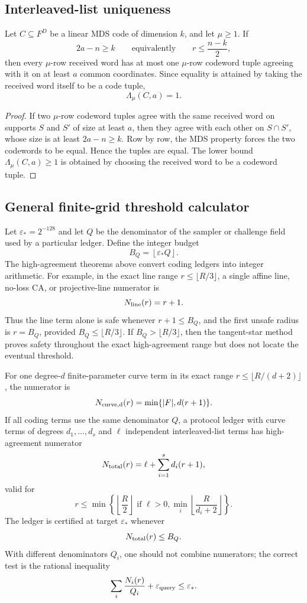 \subsection{Interleaved-list uniqueness}

\begin{theorem}
\label{thm:uniform-interleaved-uniqueness}
Let \(C\subseteq F^D\) be a linear MDS code of dimension \(k\), and let
\(\mu\ge1\).
If
\[
  2a-n\ge k
  \qquad\text{equivalently}\qquad
  r\le\frac{n-k}{2},
\]
then every \(\mu\)-row received word has at most one \(\mu\)-row codeword tuple
agreeing with it on at least \(a\) common coordinates.  Since equality is
attained by taking the received word itself to be a code tuple,
\[
  \Lambda_\mu(C,a)=1 .
\]
\end{theorem}

\begin{proof}
If two \(\mu\)-row codeword tuples agree with the same received word on supports
\(S\) and \(S'\) of size at least \(a\), then they agree with each other on
\(S\cap S'\), whose size is at least \(2a-n\ge k\).  Row by row, the MDS
property forces the two codewords to be equal.  Hence the tuples are equal.
The lower bound \(\Lambda_\mu(C,a)\ge1\) is obtained by choosing the received
word to be a codeword tuple.
\end{proof}

\subsection{General finite-grid threshold calculator}

Let \(\varepsilon_*=2^{-128}\) and let \(Q\) be the denominator of the sampler or
challenge field used by a particular ledger.  Define the integer budget
\[
  B_Q=\left\lfloor \varepsilon_* Q\right\rfloor .
\]
The high-agreement theorems above convert coding ledgers into integer arithmetic.
For example, in the exact line range \(r\le\lfloor R/3\rfloor\), a single affine
line, no-loss CA, or projective-line numerator is
\[
  N_{\rm line}(r)=r+1 .
\]
Thus the line term alone is safe whenever \(r+1\le B_Q\), and the first unsafe
radius is \(r=B_Q\), provided \(B_Q\le\lfloor R/3\rfloor\).  If
\(B_Q>\lfloor R/3\rfloor\), then the tangent-star method proves safety
throughout the exact high-agreement range but does not locate the eventual
threshold.

For one degree-\(d\) finite-parameter curve term in its exact range
\(r\le\lfloor R/(d+2)\rfloor\), the numerator is
\[
  N_{\rm curve,d}(r)=\min\{|F|,d(r+1)\}.
\]
If all coding terms use the same denominator \(Q\), a protocol ledger with curve
terms of degrees \(d_1,\ldots,d_s\) and \(\ell\) independent interleaved-list
terms has high-agreement numerator
\[
  N_{\rm total}(r)=\ell+\sum_{i=1}^s d_i(r+1),
\]
valid for
\[
  r\le
  \min\left\{
    \left\lfloor\frac R2\right\rfloor\text{ if }\ell>0,
    \min_i\left\lfloor\frac R{d_i+2}\right\rfloor
  \right\}.
\]
The ledger is certified at target \(\varepsilon_*\) whenever
\[
  N_{\rm total}(r)\le B_Q .
\]
With different denominators \(Q_i\), one should not combine numerators; the
correct test is the rational inequality
\[
  \sum_i \frac{N_i(r)}{Q_i}+\varepsilon_{\rm query}\le \varepsilon_* .
\]

